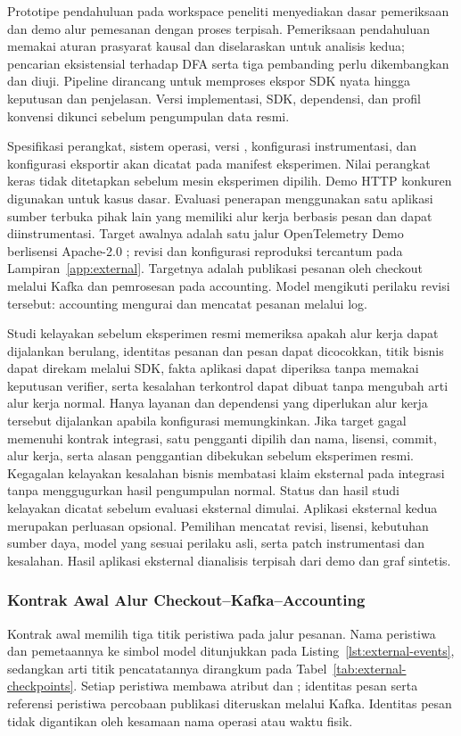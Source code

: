 Prototipe pendahuluan pada workspace peneliti menyediakan dasar pemeriksaan  dan demo alur pemesanan dengan proses terpisah. Pemeriksaan pendahuluan memakai aturan prasyarat kausal dan diselaraskan untuk analisis kedua; pencarian eksistensial terhadap DFA serta tiga pembanding perlu dikembangkan dan diuji. Pipeline dirancang untuk memproses ekspor SDK nyata hingga keputusan dan penjelasan. Versi implementasi, SDK, dependensi, dan profil konvensi dikunci sebelum pengumpulan data resmi.

Spesifikasi perangkat, sistem operasi, versi , konfigurasi instrumentasi, dan konfigurasi eksportir akan dicatat pada manifest eksperimen. Nilai perangkat keras tidak ditetapkan sebelum mesin eksperimen dipilih. Demo HTTP konkuren digunakan untuk kasus dasar. Evaluasi penerapan menggunakan satu aplikasi  sumber terbuka pihak lain yang memiliki alur kerja berbasis pesan dan dapat diinstrumentasi. Target awalnya adalah satu jalur OpenTelemetry Demo berlisensi Apache-2.0 \citep{oteldemo2025}; revisi dan konfigurasi reproduksi tercantum pada Lampiran~\ref{app:external}. Targetnya adalah publikasi pesanan oleh checkout melalui Kafka dan pemrosesan pada accounting. Model mengikuti perilaku revisi tersebut: accounting mengurai dan mencatat pesanan melalui log.

Studi kelayakan sebelum eksperimen resmi memeriksa apakah alur kerja dapat dijalankan berulang, identitas pesanan dan pesan dapat dicocokkan, titik bisnis dapat direkam melalui SDK, fakta aplikasi dapat diperiksa tanpa memakai keputusan verifier, serta kesalahan terkontrol dapat dibuat tanpa mengubah arti alur kerja normal. Hanya layanan dan dependensi yang diperlukan alur kerja tersebut dijalankan apabila konfigurasi memungkinkan. Jika target gagal memenuhi kontrak integrasi, satu pengganti dipilih dan nama, lisensi, commit, alur kerja, serta alasan penggantian dibekukan sebelum eksperimen resmi. Kegagalan kelayakan kesalahan bisnis membatasi klaim eksternal pada integrasi tanpa menggugurkan hasil pengumpulan normal. Status dan hasil studi kelayakan dicatat sebelum evaluasi eksternal dimulai. Aplikasi eksternal kedua merupakan perluasan opsional. Pemilihan mencatat revisi, lisensi, kebutuhan sumber daya, model yang sesuai perilaku asli, serta patch instrumentasi dan kesalahan. Hasil aplikasi eksternal dianalisis terpisah dari demo dan graf sintetis.

\subsubsection{Kontrak Awal Alur Checkout--Kafka--Accounting}
\label{sec:external-contract}
Kontrak awal memilih tiga titik peristiwa pada jalur pesanan. Nama peristiwa dan pemetaannya ke simbol model ditunjukkan pada Listing~\ref{lst:external-events}, sedangkan arti titik pencatatannya dirangkum pada Tabel~\ref{tab:external-checkpoints}. Setiap peristiwa membawa atribut  dan ; identitas pesan serta referensi peristiwa percobaan publikasi diteruskan melalui  Kafka. Identitas pesan tidak digantikan oleh kesamaan nama operasi atau waktu fisik.

